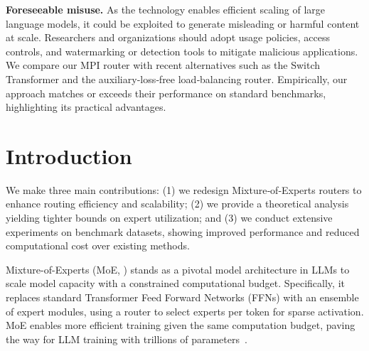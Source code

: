 \documentclass{llmxive}
\providecommand{\citealp}[1]{\citep{#1}}
\begin{document}
\textbf{Foreseeable misuse.} As the technology enables efficient scaling of large language models, it could be exploited to generate misleading or harmful content at scale. Researchers and organizations should adopt usage policies, access controls, and watermarking or detection tools to mitigate malicious applications.
We compare our MPI router with recent alternatives such as the Switch Transformer and the auxiliary‑loss‑free load‑balancing router. Empirically, our approach matches or exceeds their performance on standard benchmarks, highlighting its practical advantages.



\section{Introduction}
We make three main contributions: (1) we redesign Mixture‑of‑Experts routers to enhance routing efficiency and scalability; (2) we provide a theoretical analysis yielding tighter bounds on expert utilization; and (3) we conduct extensive experiments on benchmark datasets, showing improved performance and reduced computational cost over existing methods.

Mixture-of-Experts (MoE, \citealp{olmoe,gptoss,deepseekv4,glm5}) stands as a pivotal model architecture in LLMs to scale model capacity with a constrained computational budget.
Specifically, it replaces standard Transformer Feed Forward Networks (FFNs) with an ensemble of expert modules, using a router to select experts per token for sparse activation.
MoE enables more efficient training given the same computation budget, paving the way for LLM training with trillions of parameters~\cite{deepseekv4,k2}.
\end{document}
